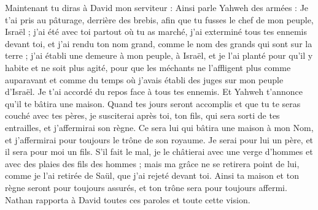 \begin{multicols}{2}
Maintenant tu diras à David mon serviteur : Ainsi parle Yahweh des armées : Je t'ai pris au pâturage, derrière des brebis, afin que tu fusses le chef de mon peuple, Israël ;
j'ai été avec toi partout où tu as marché, j'ai exterminé tous tes ennemis devant toi, et j'ai rendu ton nom grand, comme le nom des grands qui sont sur la terre ;
j’ai établi une demeure à mon peuple, à Israël, et je l’ai planté pour qu'il y habite et ne soit plus agité, pour que les méchants ne l’affligent plus comme auparavant
et comme du temps où j'avais établi des juges sur mon peuple d'Israël. Je t'ai accordé du repos face à tous tes ennemis. Et Yahweh t'annonce qu'il te bâtira une maison.
Quand tes jours seront accomplis et que tu te seras couché avec tes pères, je susciterai après toi, ton fils, qui sera sorti de tes entrailles, et j'affermirai son règne.
Ce sera lui qui bâtira une maison à mon Nom, et j'affermirai pour toujours le trône de son royaume.
Je serai pour lui un père, et il sera pour moi un fils. S’il fait le mal, je le châtierai avec une verge d’hommes et avec des plaies des fils des hommes ;
mais ma grâce ne se retirera point de lui, comme je l'ai retirée de Saül, que j'ai rejeté devant toi.
Ainsi ta maison et ton règne seront pour toujours assurés, et ton trône sera pour toujours affermi.
Nathan rapporta à David toutes ces paroles et toute cette vision.
\end{multicols}
